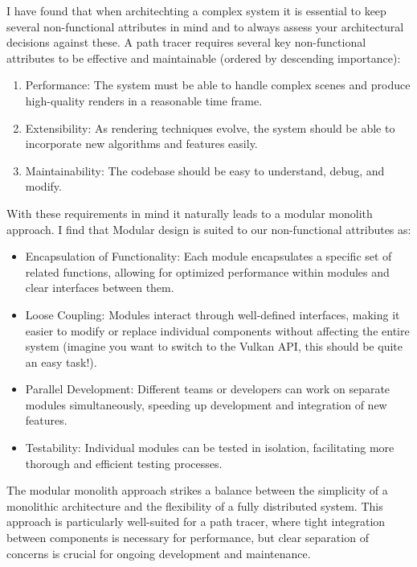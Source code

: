 \documentclass[12pt]{article}
\begin{document}
I have found that when architechting a complex system it is essential to keep several non-functional attributes in mind and to always assess your architectural decisions against these.
A path tracer requires several key non-functional attributes to be effective and maintainable (ordered by descending importance):

\begin{enumerate}
    \item Performance: The system must be able to handle complex scenes and produce high-quality renders in a reasonable time frame.
    \item Extensibility: As rendering techniques evolve, the system should be able to incorporate new algorithms and features easily.
    \item Maintainability: The codebase should be easy to understand, debug, and modify.
\end{enumerate}

With these requirements in mind it naturally leads to a modular monolith approach. I find that Modular design is suited to our non-functional attributes as:

\begin{itemize}
    \item Encapsulation of Functionality: Each module encapsulates a specific set of related functions, allowing for optimized performance within modules and clear interfaces between them.
    \item Loose Coupling: Modules interact through well-defined interfaces, making it easier to modify or replace individual components without affecting the entire system (imagine you want to switch to the Vulkan API, this should be quite an easy task!).
    \item Parallel Development: Different teams or developers can work on separate modules simultaneously, speeding up development and integration of new features.
    \item Testability: Individual modules can be tested in isolation, facilitating more thorough and efficient testing processes.
\end{itemize}

The modular monolith approach strikes a balance between the simplicity of a monolithic architecture and the flexibility of a fully distributed system. This approach is particularly well-suited for a path tracer, where tight integration between components is necessary for performance, but clear separation of concerns is crucial for ongoing development and maintenance.
\end{document}
